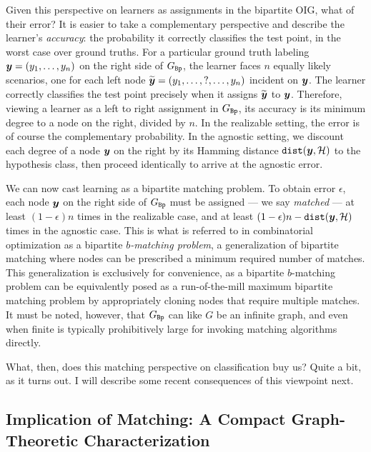 Given this perspective on learners as assignments in the bipartite OIG, what of their error? It is easier to take a complementary perspective and describe the learner's \emph{accuracy}: the probability it correctly classifies the test point, in the worst case over ground truths. For a particular ground truth labeling $\boldsymbol{ y }=(y_1,\ldots,y_n)$ on the right side of $G_{\mathtt{Bp}}$, the learner faces $n$ equally likely scenarios, one for each left node $\widetilde{\boldsymbol{ y }} = (y_1, \ldots, ? , \ldots, y_n)$ incident on $\boldsymbol{ y }$. The learner correctly classifies the test point precisely when it assigns $\widetilde{\boldsymbol{ y }}$ to  $\boldsymbol{ y }$. Therefore, viewing a learner as a left to right assignment in $G_{\mathtt{Bp}}$, its accuracy is its minimum degree to a node on the right, divided by $n$.  In the realizable setting, the error  is of course the complementary probability. In the agnostic setting, we discount each degree of a node $\boldsymbol{ y }$ on the right by its Hamming distance $\mathtt{dist}(\boldsymbol{ y },\mathcal{H})$ to the hypothesis class, then proceed identically to arrive at the agnostic error. 

We can now cast learning  as a  bipartite matching problem. To obtain error $\epsilon$, each node $\boldsymbol{ y }$ on the right side of $G_{\mathtt{Bp}}$ must be assigned --- we say \emph{matched} --- at least $(1-\epsilon) n$ times in the realizable case, and at least $(1-\epsilon) n - \mathtt{dist}(\boldsymbol{ y },\mathcal{H})$ times in the agnostic case. This is what is referred to in combinatorial optimization as a  bipartite \emph{$b$-matching problem}, a generalization of bipartite matching where nodes can be prescribed a minimum required number of matches. This generalization is exclusively for convenience, as a bipartite $b$-matching problem can be equivalently posed as  a run-of-the-mill  maximum bipartite matching problem by appropriately cloning nodes that require multiple matches. It must be noted, however, that $G_{\mathtt{Bp}}$ can like $G$ be an  infinite graph, and even when finite is typically prohibitively large for invoking matching algorithms directly.

What, then, does this matching perspective on classification  buy us? Quite a bit, as it turns out. I will describe some recent consequences  of this viewpoint next.


\subsection{Implication of Matching: A Compact Graph-Theoretic Characterization}
\label{sec:hall}



